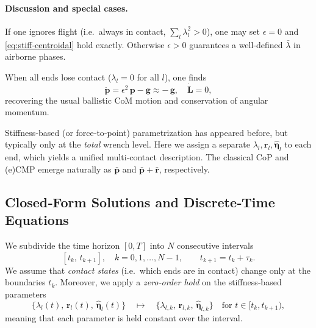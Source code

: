 \documentclass[main.tex]{subfiles}
\begin{document}
\begin{sloppypar}
\paragraph{Discussion and special cases.}
\begin{remark}
If one ignores flight (i.e.\ always in contact, $\sum_l\lambda_l^2>0$), one may set $\epsilon=0$ and \eqref{eq:stiff‐centroidal} hold exactly.  Otherwise $\epsilon>0$ guarantees a well‐defined $\bar\lambda$ in airborne phases.
\end{remark}

\begin{remark}
When all ends lose contact ($\lambda_l=0$ for all $l$), one finds
\[
\ddot{\mathbf{p}} = \epsilon^2\,\mathbf{p} - \mathbf{g} \approx -\,\mathbf{g},
\quad
\dot{\mathbf{L}} = 0,
\]
recovering the usual ballistic CoM motion and conservation of angular momentum.
\end{remark}

\begin{remark}
Stiffness‐based (or force‐to‐point) parametrization has appeared before, but typically only at the \emph{total} wrench level.  Here we assign a separate $\lambda_l,\mathbf{r}_l,\mathbf{\hat{\boldsymbol{\eta}}}_l$ to each end, which yields a unified multi‐contact description.  The classical CoP and (e)CMP emerge naturally as $\mathbf{\bar{p}}$ and $\mathbf{\bar{p}}+\mathbf{\bar{r}}$, respectively.
\end{remark}

\subsection{Closed‐Form Solutions and Discrete‐Time Equations}

We subdivide the time horizon $[0,T]$ into $N$ consecutive intervals
\[
[t_k,\,t_{k+1}],\quad k=0,1,\dots,N-1,\qquad
t_{k+1}=t_k+\tau_k.
\]
We assume that \emph{contact states} (i.e.\ which ends are in contact) change only at the boundaries $t_k$.  Moreover, we apply a \emph{zero‐order hold} on the stiffness‐based parameters
\[
\{\lambda_{l}(t),\,\mathbf{r}_{l}(t),\,\mathbf{\hat{\boldsymbol{\eta}}}_{l}(t)\}
\quad\mapsto\quad
\{\lambda_{l,k},\,\mathbf{r}_{l,k},\,\mathbf{\hat{\boldsymbol{\eta}}}_{l,k}\}
\quad\text{for }t\in[t_k,t_{k+1}),
\]
meaning that each parameter is held constant over the interval.

\medskip

\end{sloppypar}
\end{document}
